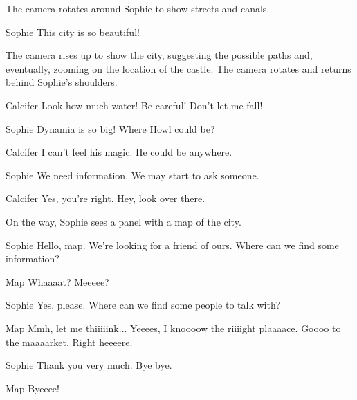 \begin{screenplay}

The camera rotates around Sophie to show streets and canals. 

\begin{dialogue}[amazed]{Sophie}
This city is so beautiful!
\end{dialogue}

The camera rises up to show the city, suggesting the possible paths and, eventually, zooming on the location of the castle. The camera rotates and returns behind Sophie's shoulders. 

\begin{dialogue}[worried]{Calcifer}
Look how much water! Be careful! Don't let me fall!
\end{dialogue}

\begin{dialogue}[discouraged]{Sophie}
Dynamia is so big! Where Howl could be?
\end{dialogue}

\begin{dialogue}{Calcifer}
I can't feel his magic. He could be anywhere.
\end{dialogue}

\begin{dialogue}[resolute]{Sophie}
We need information. We may start to ask someone.
\end{dialogue}

\begin{dialogue}{Calcifer}
Yes, you're right. Hey, look over there.
\end{dialogue}

On the way, Sophie sees a panel with a map of the city.

\begin{dialogue}{Sophie}
Hello, map. We're looking for a friend of ours. Where can we find some information?
\end{dialogue}

\begin{dialogue}[tired]{Map}
Whaaaat? Meeeee?
\end{dialogue}

\begin{dialogue}{Sophie}
Yes, please. Where can we find some people to talk with?
\end{dialogue}

\begin{dialogue}[tired]{Map}
Mmh, let me thiiiiink... Yeeees, I knoooow the riiiight plaaaace. Goooo to the maaaarket. Right heeeere.
\end{dialogue}

\begin{dialogue}{Sophie}
Thank you very much. Bye bye.
\end{dialogue}

\begin{dialogue}[tired]{Map}
Byeeee!
\end{dialogue}

\end{screenplay}
\vspace{1em}


